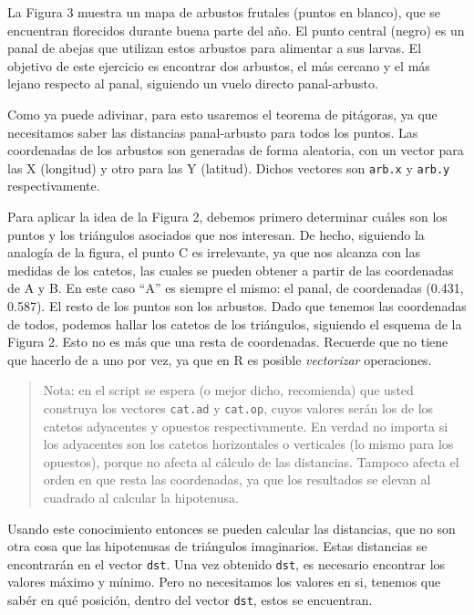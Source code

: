 \documentclass[]{article}
\begin{document}
La Figura 3 muestra un mapa de arbustos frutales (puntos en blanco), que
se encuentran florecidos durante buena parte del año. El punto central
(negro) es un panal de abejas que utilizan estos arbustos para alimentar
a sus larvas. El objetivo de este ejercicio es encontrar dos arbustos,
el más cercano y el más lejano respecto al panal, siguiendo un vuelo
directo panal-arbusto.

Como ya puede adivinar, para esto usaremos el teorema de pitágoras, ya
que necesitamos saber las distancias panal-arbusto para todos los
puntos. Las coordenadas de los arbustos son generadas de forma
aleatoria, con un vector para las X (longitud) y otro para las Y
(latitud). Dichos vectores son \texttt{arb.x} y \texttt{arb.y}
respectivamente.

Para aplicar la idea de la Figura 2, debemos primero determinar cuáles
son los puntos y los triángulos asociados que nos interesan. De hecho,
siguiendo la analogía de la figura, el punto C es irrelevante, ya que
nos alcanza con las medidas de los catetos, las cuales se pueden obtener
a partir de las coordenadas de A y B. En este caso ``A'' es siempre el
mismo: el panal, de coordenadas (0.431, 0.587). El resto de los puntos
son los arbustos. Dado que tenemos las coordenadas de todos, podemos
hallar los catetos de los triángulos, siguiendo el esquema de la Figura
2. Esto no es más que una resta de coordenadas. Recuerde que no tiene
que hacerlo de a uno por vez, ya que en R es posible \emph{vectorizar}
operaciones.

\begin{quote}
Nota: en el script se espera (o mejor dicho, recomienda) que usted
construya los vectores \texttt{cat.ad} y \texttt{cat.op}, cuyos valores
serán los de los catetos adyacentes y opuestos respectivamente. En
verdad no importa si los adyacentes son los catetos horizontales o
verticales (lo mismo para los opuestos), porque no afecta al cálculo de
las distancias. Tampoco afecta el orden en que resta las coordenadas, ya
que los resultados se elevan al cuadrado al calcular la hipotenusa.

\end{quote}
Usando este conocimiento entonces se pueden calcular las distancias, que
no son otra cosa que las hipotenusas de triángulos imaginarios. Estas
distancias se encontrarán en el vector \texttt{dst}. Una vez obtenido
\texttt{dst}, es necesario encontrar los valores máximo y mínimo. Pero
no necesitamos los valores en si, tenemos que sabér en qué posición,
dentro del vector \texttt{dst}, estos se encuentran.
\end{document}
